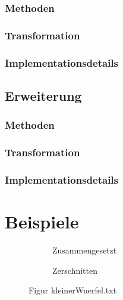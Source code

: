 \documentclass[a4paper,10pt,ngerman]{scrartcl}
\newcommand{\simplecube}[8]%
{
    \begin{scope}[shift={#1}]
        \fill[gray!40,canvas is yz plane at x=#2, opacity=#8] (0,0) rectangle (#3,#4);
        \fill[gray!10,canvas is xz plane at y=#3, opacity=#8] (0,0) rectangle (#2,#4);
        \fill[white  ,canvas is xy plane at z=#4, opacity=#8] (0,0) rectangle (#2,#3);
        \foreach\i/\j in {0/1, 1/1, 1/0}
            {
            \draw[line#5] (0,#3*\i,#4*\j) --++ (#2,0,0);
            \draw[line#6] (#2*\i,0,#4*\j) --++ (0,#3,0);
            \draw[line#7] (#2*\i,#3*\j,0) --++ (0,0,#4);
        }
    \end{scope}
}
\newcommand{\smallSquare}[4]%
{
    \begin{scope}[shift={#1}]
        \simplecube{(0,     0,      0)}     {1}{2}{2}   {a}{a}{a}   {1}
        \simplecube{(1+#4,   0,      0))}    {1}{2}{2}   {a}{a}{a}   {1}
    \end{scope}
}
\begin{document}
    \subsubsection{Methoden}\label{subsubsec:methoden}
    \subsubsection{Transformation}\label{subsubsec:transformation}
    \subsubsection{Implementationsdetails}\label{subsubsec:implementationsdetails}

    \subsection{Erweiterung}\label{subsec:erweiterung2}

    \subsubsection{Methoden}\label{subsubsec:methoden_erweiterung}
    \subsubsection{Transformation}\label{subsubsec:transformation_erweiterung}
    \subsubsection{Implementationsdetails}\label{subsubsec:implementationsdetails_erweiterung}

    \newpage


    \section{Beispiele}\label{sec:beispiele}

    \begin{figure}[H]
        \centering
        \def\a{3.2}
        \def\b{1.2}
        \begin{subfigure}[b]{0.45\textwidth}
            \centering %
            \caption{Zusammengesetzt}\label{fig:figA2}
        \end{subfigure}
        \begin{subfigure}[b]{0.45\textwidth}
            \centering %
            \caption{Zerschnitten}\label{fig:figB2}
        \end{subfigure}
        \caption{Figur kleinerWuerfel.txt}\label{fig:figAB2}
    \end{figure}
\end{document}
